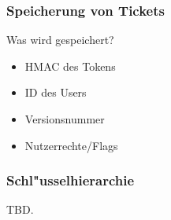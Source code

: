 \begin{frame}
	\frametitle{Speicherung von Tickets}
	Was wird gespeichert?
	\begin{itemize}
		\item<2-> HMAC des Tokens
		\item<3-> ID des Users
		\item<4-> Versionsnummer
		\item<5-> Nutzerrechte/Flags
	\end{itemize}
\end{frame}

\begin{frame}
	\frametitle{Schl"usselhierarchie}
	TBD.
\end{frame}

